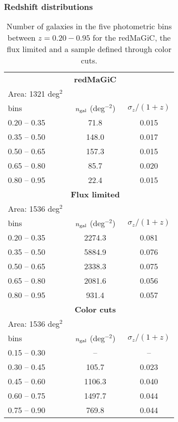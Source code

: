\documentclass[a4paper,fleqn,usenatbib]{mnras}
\begin{document}
\subsubsection{Redshift distributions}

\begin{table}
\centering
\caption{Number of galaxies in the five photometric bins between $z=0.20-0.95$ for the redMaGiC, the  flux limited and a sample defined through color cuts.}
 \label{tab: bin_n_size}
 \begin{tabular}{lcc}
  \hhline{===}
   &   {\textbf{redMaGiC}}&  \\
  Area: 1321 deg$^2$ & & \\
  \hline
   bins&  $n_{\mbox{\scriptsize{gal}}}$ (deg$^{-2}$)   & ${\sigma}_z/(1+z)$ \\
  \hline
  0.20 -- 0.35 & 71.8  & 0.015 \\
  0.35 -- 0.50 & 148.0 & 0.017 \\
  0.50 -- 0.65 &  157.3 & 0.015 \\
  0.65 -- 0.80 &  85.7 & 0.020 \\
  0.80 -- 0.95 &  22.4 & 0.015 \\
  \hline
  \hhline{===}
   & {\textbf{Flux limited}} &  \\
   Area: 1536 deg$^2$ & & \\
   \hline
   bins&  $n_{\mbox{\scriptsize{gal}}}$ (deg$^{-2}$)   & ${\sigma}_z/(1+z)$  \\
  \hline
  0.20 -- 0.35 & 2274.3 & 0.081  \\
  0.35 -- 0.50 & 5884.9  & 0.076  \\
  0.50 -- 0.65 & 2338.3 & 0.075 \\
  0.65 -- 0.80 & 2081.6 & 0.056 \\
  0.80 -- 0.95 & 931.4 & 0.057 \\
  \hline
  \hhline{===}
  & {\textbf{Color cuts}} &  \\
   Area: 1536 deg$^2$ & & \\
   \hline
   bins&   $n_{\mbox{\scriptsize{gal}}}$ (deg$^{-2}$)    & ${\sigma}_{z}/(1+z)$  \\
  \hline
  0.15 -- 0.30 & -- & -- \\
  0.30 -- 0.45 & 105.7  & 0.023 \\
  0.45 -- 0.60 & 1106.3 & 0.040 \\
  0.60 -- 0.75 & 1497.7 & 0.044 \\
  0.75 -- 0.90 & 769.8 & 0.044 \\
  \hline
 \end{tabular}
\end{table}
\end{document}
